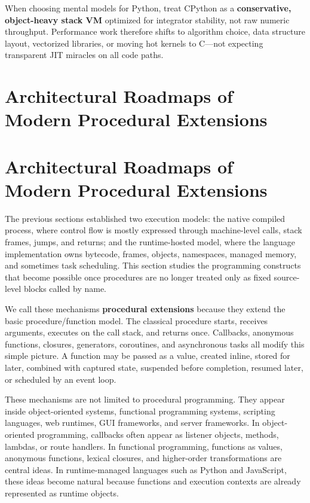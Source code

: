 \documentclass[a4paper,twoside]{report}
\begin{document}
When choosing mental models for Python, treat CPython as a \textbf{conservative, object-heavy stack VM} optimized for integrator stability, not raw numeric throughput. Performance work therefore shifts to algorithm choice, data structure layout, vectorized libraries, or moving hot kernels to C---not expecting transparent JIT miracles on all code paths.


\section{Architectural Roadmaps of Modern Procedural Extensions}


\section{Architectural Roadmaps of Modern Procedural Extensions}

The previous sections established two execution models: the native compiled process, where control flow is mostly expressed through machine-level calls, stack frames, jumps, and returns; and the runtime-hosted model, where the language implementation owns bytecode, frames, objects, namespaces, managed memory, and sometimes task scheduling. This section studies the programming constructs that become possible once procedures are no longer treated only as fixed source-level blocks called by name.

We call these mechanisms \textbf{procedural extensions} because they extend the basic procedure/function model. The classical procedure starts, receives arguments, executes on the call stack, and returns once. Callbacks, anonymous functions, closures, generators, coroutines, and asynchronous tasks all modify this simple picture. A function may be passed as a value, created inline, stored for later, combined with captured state, suspended before completion, resumed later, or scheduled by an event loop.

These mechanisms are not limited to procedural programming. They appear inside object-oriented systems, functional programming systems, scripting languages, web runtimes, GUI frameworks, and server frameworks. In object-oriented programming, callbacks often appear as listener objects, methods, lambdas, or route handlers. In functional programming, functions as values, anonymous functions, lexical closures, and higher-order transformations are central ideas. In runtime-managed languages such as Python and JavaScript, these ideas become natural because functions and execution contexts are already represented as runtime objects.
\end{document}
